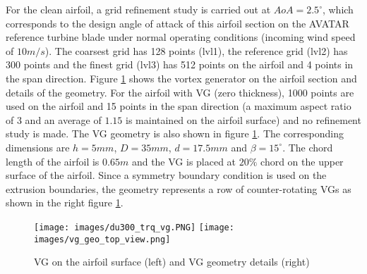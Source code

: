For the clean airfoil, a grid refinement study is carried out at $AoA=2.5^{\circ}$, which corresponds to the design angle of attack of this airfoil section on the AVATAR reference turbine blade under normal operating conditions (incoming wind speed of $10m/s$). The coarsest grid has 128 points (lvl1), the reference grid (lvl2) has 300 points and the finest grid (lvl3) has 512 points on the airfoil and 4 points in the span direction. Figure \ref{fig:geo_vg_mesh} shows the vortex generator on the airfoil section and details of the geometry. For the airfoil with VG (zero thickness), 1000 points are used on the airfoil and 15 points in the span direction (a maximum aspect ratio of $3$ and an average of $1.15$ is maintained on the airfoil surface) and no refinement study is made. The VG geometry is also shown in figure \ref{fig:geo_vg_mesh}. The corresponding dimensions are $h=5mm$, $D=35mm$, $d=17.5mm$ and $\beta = 15^{\circ}$. The chord length of the airfoil is $0.65m$ and the VG is placed at $20\%$ chord on the upper surface of the airfoil\cite{baldacchino2018experimental}. Since a symmetry boundary condition is used on the extrusion boundaries, the geometry represents a row of counter-rotating VGs as shown in the right figure \ref{fig:geo_vg_mesh}.
\begin{figure}[h]
    \centering
    \texttt{[image: images/du300\_trq\_vg.PNG]}
    \texttt{[image: images/vg\_geo\_top\_view.png]} 
    \vspace*{-0.2cm}
    \caption{VG on the airfoil surface (left) and VG geometry details \cite{baldacchino2018experimental}(right)}
   \label{fig:geo_vg_mesh}
\end{figure}


